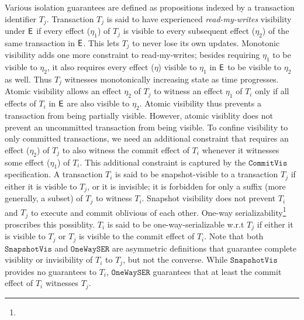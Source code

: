 Various isolation guarantees are defined as propositions indexed by
a transaction identifier $T_j$. Transaction $T_j$ is said to have
experienced \emph{read-my-writes} visibility under $\textsf{E}$ if every
effect ($\eta_1$) of $T_j$ is visible to every subsequent effect
($\eta_2$) of the same transaction in $\textsf{E}$. This lets $T_j$ to never
lose its own updates. Monotonic visibility adds one more constraint to
read-my-writes; besides requiring $\eta_1$ to be visible to $\eta_2$,
it also requires every effect ($\eta$) visible to $\eta_1$ in $\textsf{E}$ to
be visible to $\eta_2$ as well. Thus $T_j$ witnesses monotonically
increasing state as time progresses. Atomic visibility allows an
effect $\eta_2$ of $T_j$ to witness an effect $\eta_1$ of $T_i$ only
if all effects of $T_i$ in $\textsf{E}$ are also visible to $\eta_2$. Atomic
visibility thus prevents a transaction from being partially visible.
However, atomic visiblity does not prevent an uncommitted transaction
from being visible. To confine visibility to only committed
transactions, we need an additional constraint that requires an effect
($\eta_2$) of $T_j$ to also witness the commit effect of $T_i$
whenever it witnesses some effect ($\eta_1$) of $T_i$. This additional
constraint is captured by the $\mathtt{CommitVis}$ specification. A
transaction $T_i$ is said to be snapshot-visible to a transaction
$T_j$ if either it is visible to $T_j$, or it is invisible; it is
forbidden for only a suffix (more generally, a subset) of $T_j$ to
witness $T_i$. Snapshot visibility does not prevent $T_i$ and $T_j$ to
execute and commit oblivious of each other. One-way
serializability\footnote{} proscribes this possiblity. $T_i$
is said to be one-way-serializable w.r.t $T_j$ if either it is visible
to $T_j$ or $T_j$ is visible to the commit effect of $T_i$.  Note that
both $\mathtt{SnapshotVis}$ and $\mathtt{OneWaySER}$ are asymmetric
definitions that guarantee complete visiblity or invisibility of $T_i$
to $T_j$, but not the converse. While $\mathtt{SnapshotVis}$ provides
no guarantees to $T_i$, $\mathtt{OneWaySER}$ guarantees that at least
the commit effect of $T_i$ witnesses $T_j$.

